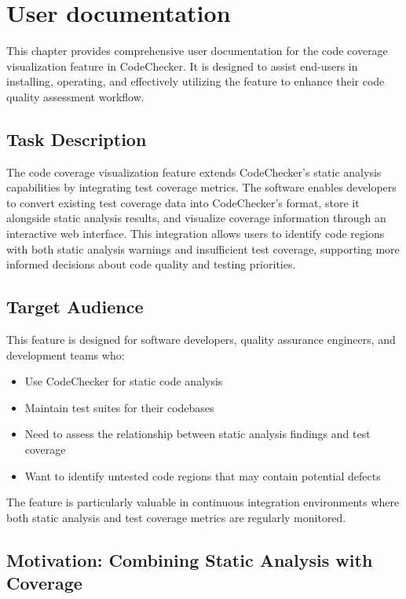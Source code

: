 \chapter{User documentation}
\label{ch:user}

This chapter provides comprehensive user documentation for the code coverage visualization feature in CodeChecker. It is designed to assist end-users in installing, operating, and effectively utilizing the feature to enhance their code quality assessment workflow.

\section{Task Description}

The code coverage visualization feature extends CodeChecker's static analysis capabilities by integrating test coverage metrics. The software enables developers to convert existing test coverage data into CodeChecker's format, store it alongside static analysis results, and visualize coverage information through an interactive web interface. This integration allows users to identify code regions with both static analysis warnings and insufficient test coverage, supporting more informed decisions about code quality and testing priorities.

\section{Target Audience}

This feature is designed for software developers, quality assurance engineers, and development teams who:
\begin{itemize}
    \item Use CodeChecker for static code analysis
    \item Maintain test suites for their codebases
    \item Need to assess the relationship between static analysis findings and test coverage
    \item Want to identify untested code regions that may contain potential defects
\end{itemize}

The feature is particularly valuable in continuous integration environments where both static analysis and test coverage metrics are regularly monitored.

\section{Motivation: Combining Static Analysis with Coverage}

